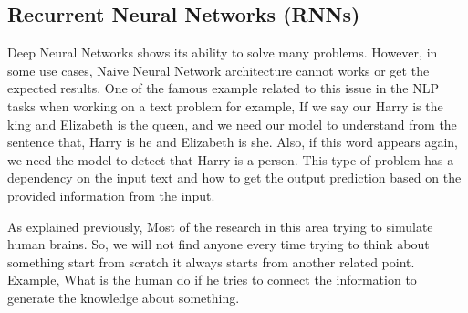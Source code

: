 \subsection{Recurrent Neural Networks (RNNs)}\label{sec:RNN}

Deep Neural Networks shows its ability to solve many problems. However, in some use cases, Naive Neural Network architecture cannot works or get the expected results. One of the famous example related to this issue in the NLP tasks when working on a text problem for example, If we say our Harry is the king and Elizabeth is the queen, and we need our model to understand from the sentence that, Harry is he and Elizabeth is she. Also, if this word appears again, we need the model to detect that Harry is a person.
This type of problem has a dependency on the input text and how to get the output prediction based on the provided information from the input.

As explained previously, Most of the research in this area trying to simulate human brains. So, we will not find anyone every time trying to think about something start from scratch it always starts from another related point. Example, What is the human do if he tries to connect the information to generate the knowledge about something.

